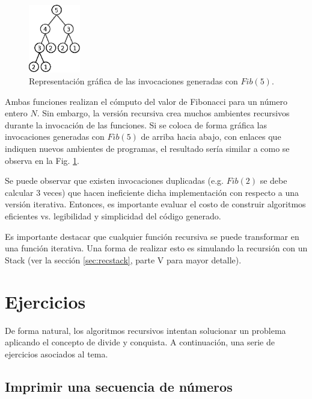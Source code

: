 \begin{figure}[htpb!]
  \begin{center}
    \includegraphics[width=0.2\textwidth]{images/fibonacciTree.eps}
  \end{center}
  \caption{Representación gráfica de las invocaciones generadas con $Fib(5)$.}
  \label{fig:Ch1fib}
\end{figure}

Ambas funciones realizan el cómputo del valor de Fibonacci para un número entero $N$. Sin embargo, la versión recursiva crea muchos ambientes recursivos durante la invocación de las funciones. Si se coloca de forma gráfica las invocaciones generadas con $Fib(5)$ de arriba hacia abajo, con enlaces que indiquen nuevos ambientes de programas, el resultado sería similar a como se observa en la Fig. \ref{fig:Ch1fib}. 

Se puede observar que existen invocaciones duplicadas (e.g. $Fib(2)$ se debe calcular 3 veces) que hacen ineficiente dicha implementación con respecto a una versión iterativa. Entonces, es importante evaluar el costo de construir algoritmos eficientes vs. legibilidad y simplicidad del código generado.

Es importante destacar que cualquier función recursiva se puede transformar en una función iterativa. Una forma de realizar esto es simulando la recursión con un Stack (ver la sección \ref{sec:recstack}, parte V para mayor detalle).

\section{Ejercicios}

De forma natural, los algoritmos recursivos intentan solucionar un problema aplicando el concepto de divide y conquista. A continuación, una serie de ejercicios asociados al tema.

\subsection{Imprimir una secuencia de números}

